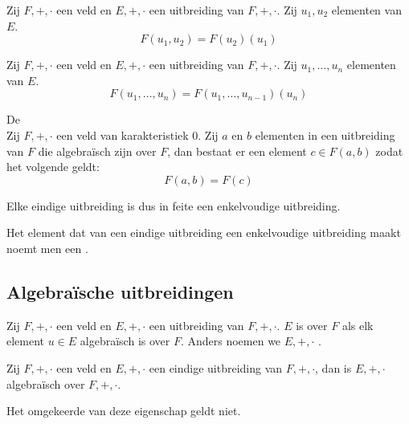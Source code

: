 \documentclass[main.tex]{subfiles}
\begin{document}
\begin{st}
  Zij $F,+,\cdot$ een veld en $E,+,\cdot$ een uitbreiding van $F,+,\cdot$.
  Zij $u_{1},u_{2}$ elementen van $E$.
  \[ F(u_{1},u_{2}) = F(u_{2})(u_{1})\]
\end{st}

\begin{st}
  Zij $F,+,\cdot$ een veld en $E,+,\cdot$ een uitbreiding van $F,+,\cdot$.
  Zij $u_{1},\dotsc,u_{n}$ elementen van $E$.
  \[ F(u_{1},\dotsc,u_{n}) = F(u_{1},\dotsc,u_{n-1})(u_{n})\]
\end{st}

\begin{st}
  De \\
  Zij $F,+,\cdot$ een veld van karakteristiek $0$.
  Zij $a$ en $b$ elementen in een uitbreiding van $F$ die algebra\"isch zijn over $F$,
  dan bestaat er een element $c\in F(a,b)$ zodat het volgende geldt:
  \[ F(a,b) = F(c) \]
  \zb
\end{st}

\begin{opm}
  Elke eindige uitbreiding is dus in feite een enkelvoudige uitbreiding.
\end{opm}

\begin{de}
  Het element dat van een eindige uitbreiding een enkelvoudige uitbreiding maakt noemt men een .
\end{de}

\subsection{Algebra\"ische uitbreidingen}
\label{sec:algebr-uitbr}
\begin{de}
  Zij $F,+,\cdot$ een veld en $E,+,\cdot$ een uitbreiding van $F,+,\cdot$.
  $E$ is  over $F$ als elk element $u\in E$ algebra\"isch is over $F$.
  Anders noemen we $E,+,\cdot$ .
\end{de}

\begin{pr}
  Zij $F,+,\cdot$ een veld en $E,+,\cdot$ een eindige uitbreiding van $F,+,\cdot$, dan is $E,+,\cdot$ algebra\"isch over $F,+,\cdot$.
\end{pr}

\begin{opm}
  Het omgekeerde van deze eigenschap geldt niet.
\end{opm}
\end{document}
